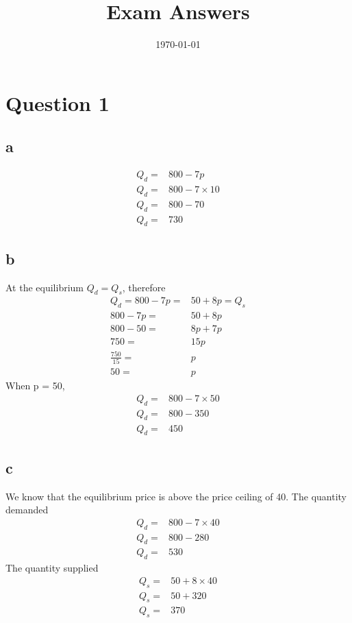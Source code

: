\documentclass[12pt, a4paper, oneside]{article}\usepackage[]{graphicx}\usepackage[]{color}
\begin{document}
\title{Exam Answers}
\date{\today}
\maketitle
\section*{Question 1}
\subsection*{a}
\begin{align*}
Q_d =& 800 - 7p\\
Q_d =& 800 - 7 \times 10\\
Q_d =& 800 - 70\\
Q_d =& 730
\end{align*}

\subsection*{b}
At the equilibrium $Q_d = Q_s$, therefore
\begin{align*}
Q_d = 800 - 7p =& 50 +8p = Q_s\\
800 - 7p =& 50 + 8p\\
800 -50 =& 8p + 7p\\
750 =& 15p\\
\frac{750}{15} =& p\\
50 =& p
\end{align*}
When p = 50, 
\begin{align*}
Q_d =& 800 - 7 \times 50\\
Q_d =& 800 - 350\\
Q_d =& 450
\end{align*}

\subsection*{c}
We know that the equilibrium price is above the price ceiling of 40.
The quantity demanded
\begin{align*}
Q_d =& 800 - 7 \times 40\\
Q_d =& 800 - 280\\
Q_d =& 530
\end{align*}
The quantity supplied
\begin{align*}
Q_s =& 50 + 8 \times 40\\
Q_s =& 50 + 320\\
Q_s =& 370
\end{align*}
\end{document}
